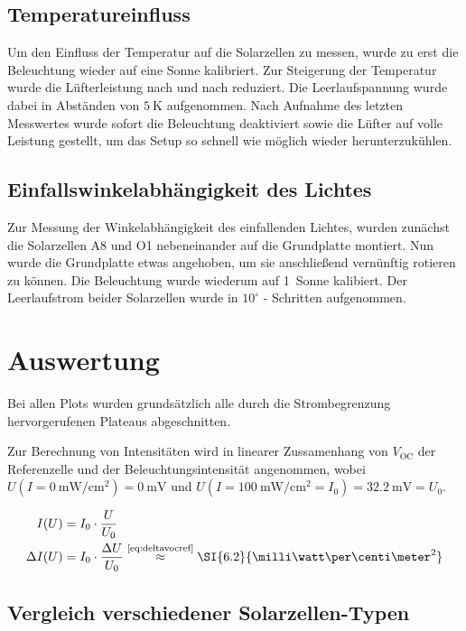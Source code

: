 \documentclass[slug=SZ, room=Hermann-Krone-Bau\,\ Labor\ 1.25, supervisor=Martin\ Kroll]{../../Lab_Report_LaTeX/lab_report}
\newcommand{\sun}[1]{\SI{#1}{Sonne}}
\newcommand{\mwcm}[1]{\SI{#1}{\milli\watt\per\centi\meter^2}}
\newcommand{\voc}{V_{\text{OC}}}
\begin{document}
\subsection{Temperatureinfluss}
\label{sec:tempeinfl}

Um den Einfluss der Temperatur auf die Solarzellen zu messen, wurde zu erst die Beleuchtung
wieder auf eine Sonne kalibriert. Zur Steigerung der Temperatur wurde die Lüfterleistung
nach und nach reduziert. Die Leerlaufspannung wurde dabei in Abständen von \(\SI{5}{\kelvin}\)
aufgenommen. Nach Aufnahme des letzten Messwertes wurde sofort die Beleuchtung deaktiviert
sowie die Lüfter auf volle Leistung gestellt, um das Setup so schnell wie möglich wieder
herunterzukühlen.

\subsection{Einfallswinkelabhängigkeit des Lichtes}
\label{sec:einfwink}

Zur Messung der Winkelabhängigkeit des einfallenden Lichtes, wurden zunächst die Solarzellen
A8 und O1 nebeneinander auf die Grundplatte montiert. Nun wurde die Grundplatte
etwas angehoben, um sie anschließend vernünftig rotieren zu
können. Die Beleuchtung wurde wiederum auf \sun{1} kalibiert.
Der Leerlaufstrom beider Solarzellen wurde in \(10^\circ\) - Schritten aufgenommen.


\section{Auswertung}
\label{sec:auswert}
Bei allen Plots wurden grunds\"atzlich alle durch die Strombegrenzung
hervorgerufenen Plateaus abgeschnitten.

Zur Berechnung von Intensit\"aten wird in linearer Zussamenhang von
\(\voc\) der Referenzelle und der Beleuchtungsintensität angenommen,
wobei \(U(I=\mwcm{0})=\SI{0}{\milli\volt}\) und
\(U(I=\mwcm{100}=I_0)=\SI{32.2}{\milli\volt}=U_0\).

\begin{align}
  \label{eq:refint}
  I(U) &= I_0\cdot\frac{U}{U_0} \\
  \Delta I(U) &= I_0\cdot\frac{\Delta U}{U_0} \overset{\text{\ref{eq:deltavocref}}}{\approx} \mwcm{6.2}
\end{align}


\subsection{Vergleich verschiedener Solarzellen-Typen}
\label{sec:aussoztyp}
\end{document}

